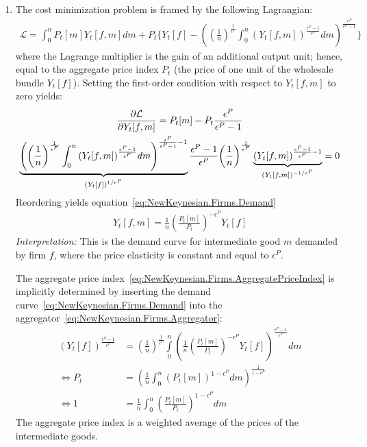 \begin{enumerate}
\item The cost minimization problem is framed by the following Lagrangian:
\begin{align*}
\mathcal{L} = \int_{0}^{n} P_{t}[m] Y_{t}[f,m] dm
+ P_{t} \Bigg \{
  Y_{t}[f] - {\left( {\left(\frac{1}{n}\right)}^{\frac{1}{\epsilon^{P}}} \int_{0}^{n} {(Y_{t}[f,m])}^{\frac{\epsilon^{P}-1}{\epsilon^{P}}} dm \right)}^{\frac{\epsilon^{P}}{\epsilon^{P}-1}}
\Bigg \}
\end{align*}
where the Lagrange multiplier is the gain of an additional output unit;
hence, equal to the aggregate price index \(P_{t}\) (the price of one unit of the wholesale bundle \(Y_{t}[f]\)).
Setting the first-order condition with respect to \(Y_{t}[f,m]\) to zero yields:
\begin{multline*}
\frac{\partial \mathcal{L} }{\partial Y_{t}[f,m]} =
P_{t}[m] - P_{t} \frac{\epsilon^{P}}{\epsilon^{P}-1}
\\
\underbrace{%
  {\left(
    {\left(\frac{1}{n}\right)}^{\frac{1}{\epsilon^{P}}}
    \int_{0}^{n} {(Y_{t}[f,m])}^{\frac{\epsilon^{P}-1}{\epsilon^{P}}}dm
  \right)}^{\frac{\epsilon^{P}}{\epsilon^{P}-1}-1}
}_{{(Y_{t}[f])}^{1/\epsilon^{P}}}
\frac{\epsilon^{P}-1}{\epsilon^{P}}
{\left(\frac{1}{n}\right)}^{\frac{1}{\epsilon^{P}}}
\underbrace{%
  {(Y_{t}[f,m])}^{\frac{\epsilon^{P}-1}{\epsilon^{P}}-1}
}_{{(Y_{t}[f,m])}^{-1/\epsilon^{P}}}
= 0
\end{multline*}
Reordering yields equation~\eqref{eq:NewKeynesian.Firms.Demand}
\begin{align*}
Y_{t}[f,m] = \frac{1}{n} {\left(\frac{P_{t}[m]}{P_{t}}\right)}^{-\epsilon^{P}} Y_{t}[f]
\end{align*}
\emph{Interpretation:}
This is the demand curve for intermediate good \(m\) demanded by firm \(f\),
  where the price elasticity is constant and equal to \(\epsilon^{P}\).

The aggregate price index~\eqref{eq:NewKeynesian.Firms.AggregatePriceIndex} is implicitly determined
  by inserting the demand curve~\eqref{eq:NewKeynesian.Firms.Demand}
  into the aggregator~\eqref{eq:NewKeynesian.Firms.Aggregator}:
\begin{align*}
{(Y_{t}[f])}^{\frac{\epsilon^{P}-1}{\epsilon^{P}}} &=
  {\left(\frac{1}{n}\right)}^{\frac{1}{\epsilon^{P}}}
  \int\limits_{0}^{n} {\left(
                       \frac{1}{n} {\left(\frac{P_{t}[m]}{P_{t}}\right)}^{-\epsilon^{P}} Y_{t}[f]
                       \right)}^{\frac{\epsilon^{P}-1}{\epsilon^{P}}}
                       dm
\\
\Leftrightarrow
P_t &= {\left(\frac{1}{n} \int_{0}^{n} {(P_{t}[m])}^{1-\epsilon^{P}}dm\right)}^{\frac{1}{1-\epsilon^{P}}}
\\
\Leftrightarrow
1 &= \frac{1}{n} \int_{0}^{n} {\left(\frac{P_{t}[m]}{P_{t}}\right)}^{1-\epsilon^{P}}dm
\end{align*}
The aggregate price index is a weighted average of the prices of the intermediate goods.


\end{enumerate}
